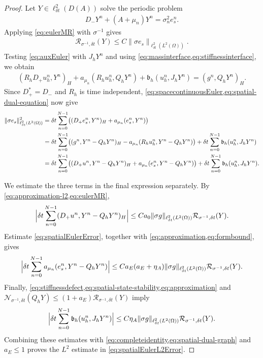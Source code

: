 \documentclass[print,wide,eng]{draft}
\begin{document}
\begin{proof}
Let $Y\in\ell_{\delta t}^2(D(A))$ solve the periodic problem
%
\begin{align}\label{eq:spatial-dual-equation}
D_-Y^n+(A+\mu_n)Y^n=\sigma_n^2e_s^n.
\end{align}
%
Applying \cref{eq:eulerMR} with $\sigma^{-1}$ gives\vspace{-2mm}
%
\begin{align}\label{eq:spatial-dual-graph}
\mathcal R_{\sigma^{-1},{\delta t}}(Y)
\leq C\|\sigma e_s\|_{\ell_{\delta t}^2(L^2(\Omega))}.
\end{align}
%
Testing \cref{eq:auxEuler} with $J_hY^n$ and using \cref{eq:massinterface,eq:stiffnessinterface}, we obtain
%
\begin{align*}
(R_hD_+u_h^n,Y^n)_H+a_{\mu_n}(R_hu_h^n,Q_hY^n)
+\mathfrak b_h(u_h^n,J_hY^n)=(g^n,Q_hY^n)_H.
\end{align*}
%
Since $D_+^*=D_-$ and $R_h$ is time independent, \cref{eq:spacecontinuousEuler,eq:spatial-dual-equation} now give
%
\begin{align}\label{eq:completeidentity}
\|\sigma e_s\|_{\ell_{\delta t}^2(L^2(\Omega))}^2
&={\delta t}\sum_{n=0}^{N-1}\bigl((D_+e_s^n,Y^n)_H+a_{\mu_n}(e_s^n,Y^n)\bigr)\notag\\
&={\delta t}\sum_{n=0}^{N-1}\bigl((g^n,Y^n-Q_hY^n)_H
-a_{\mu_n}(R_hu_h^n,Y^n-Q_hY^n)\bigr)
+{\delta t}\sum_{n=0}^{N-1}\mathfrak b_h(u_h^n,J_hY^n)\notag\\
&={\delta t}\sum_{n=0}^{N-1}\bigl((D_+u^n,Y^n-Q_hY^n)_H
+a_{\mu_n}(e_s^n,Y^n-Q_hY^n)\bigr)
+{\delta t}\sum_{n=0}^{N-1}\mathfrak b_h(u_h^n,J_hY^n).
\end{align}
%

We estimate the three terms in the final expression separately. By \cref{eq:approximation-l2,eq:eulerMR},
%
\begin{align*}
\Bigl|{\delta t}\sum_{n=0}^{N-1}(D_+u^n,Y^n-Q_hY^n)_H\Bigr|
\leq Ca_0\|\sigma g\|_{\ell_{\delta t}^2(L^2(\Omega))}\mathcal R_{\sigma^{-1},{\delta t}}(Y).
\end{align*}
%
Estimate \cref{eq:spatialEulerError}, together with \cref{eq:approximation,eq:formbound}, gives
%
\begin{align*}
\Bigl|{\delta t}\sum_{n=0}^{N-1} a_{\mu_n}(e_s^n,Y^n-Q_hY^n)\Bigr|
\leq Ca_E(a_E+\eta_A)\|\sigma g\|_{\ell_{\delta t}^2(L^2(\Omega))}\mathcal R_{\sigma^{-1},{\delta t}}(Y).
\end{align*}
%
Finally, \cref{eq:stiffnessdefect,eq:spatial-state-stability,eq:approximation} and
$\mathcal N_{\sigma^{-1},{\delta t}}(Q_hY)\leq(1+a_E)\mathcal R_{\sigma^{-1},{\delta t}}(Y)$ imply
%
\begin{align*}
\Bigl|{\delta t}\sum_{n=0}^{N-1}\mathfrak b_h(u_h^n,J_hY^n)\Bigr|
\leq C\eta_A\|\sigma g\|_{\ell_{\delta t}^2(L^2(\Omega))}\mathcal R_{\sigma^{-1},{\delta t}}(Y).
\end{align*}
%
Combining these estimates with \cref{eq:completeidentity,eq:spatial-dual-graph} and $a_E\leq1$ proves the $L^2$ estimate in \cref{eq:spatialEulerL2Error}.
\end{proof}
%
\end{document}
